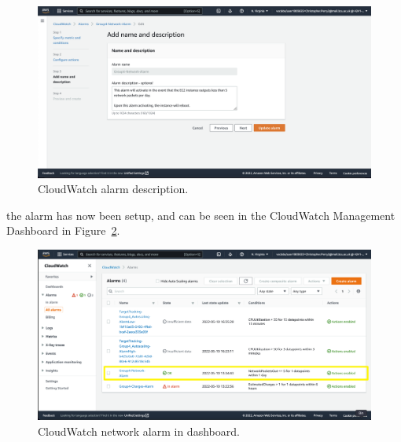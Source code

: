 \begin{figure}[!htbp]
    \centering
    \includegraphics[width=\textwidth]{resources/cloudwatch/cloudwatch-description}
    \caption{CloudWatch alarm description.}
    \label{fig:cloudwatch-description}
\end{figure}

the alarm has now been setup, and can be seen in the CloudWatch Management Dashboard in Figure~\ref{fig:cloudwatch-network-alarm}.

\begin{figure}[!htbp]
    \centering
    \includegraphics[width=\textwidth]{resources/cloudwatch/cloudwatch-network-alarm-complete}
    \caption{CloudWatch network alarm in dashboard.}
    \label{fig:cloudwatch-network-alarm}
\end{figure}







